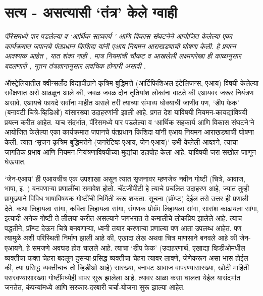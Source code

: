 \chapter{सत्य - असत्यासी `तंत्र' केले ग्वाही}

{\textit{पॅरिसमध्ये पार पडलेल्या व `आर्थिक सहकार्य '  आणि विकास संघटनेने आयोजित केलेल्या एका कार्यक्रमात जपानचे पंतप्रधान किशिदा यांनी एआय नियमन आराखड्याची घोषणा केली. हे प्रयत्न आवश्यक आहेत ,  यात शंका नाही .  मात्र नियमांची चौकट व आखलेली लक्ष्मणरेखा ही काळानुसार बदलणारी , नूतन तंत्रज्ञानानुसार लवचिक होणारी असावी . }}

\vspace{1.5em}

ऑस्ट्रेलियातील क्वीन्सलँड विद्यापीठाने कृत्रिम बुद्धिमत्ते (आर्टिफिशिअल इंटेलिजन्स, एआय) विषयी केलेल्या सर्वेक्षणात असे आढळून आले की, जवळ जवळ दोन तृतियांश लोकांना वाटते की एआयवर जरूर नियंत्रण असावे. एआयचे फायदे सर्वांना माहीत असले तरी त्याच्या संभाव्य धोक्याची जाणीव पण, `डीप फेक' (बनावटी चित्रे-व्हिडिओ) यांसारख्या उदाहरणांनी झाली आहे. प्रगत देश याविषयी नियमन-कायद्यांविषयी प्रयत्न करीत आहेत. याच संदर्भात, पॅरिसमध्ये पार पडलेल्या व `आर्थिक सहकार्य आणि विकास संघटने'ने आयोजित केलेल्या एका कार्यक्रमात जपानचे पंतप्रधान किशिदा यांनी एआय नियमन आराखड्याची घोषणा केली. त्यात `सृजन कृत्रिम बुद्धिमत्तेने (जनरेटिव्ह एआय, जेन-एआय)'  उभी केलेली आव्हाने, त्याचा जागतिक प्रभाव आणि नियमन-नियंत्रणाविषयीच्या मुद्यांचा उहापोह केला आहे. याविषयी जरा सखोल जाणून घेऊयात.

`जेन-एआय' ही एआयचीच एक उपशाखा असून त्यात सृजनावर म्हणजेच नवीन गोष्टी (चित्रे, आवाज, भाषा, इ. ) बनवणाऱ्या प्रणालींचा समावेश होतो. चॅटजीपीटी हे त्याचे प्रचलित उदाहरण आहे, ज्यात तुम्ही प्रामुख्याने विविध भाषाविषयक गोष्टींची निर्मिती करू शकता. सूचना (प्रॉम्प्ट) देईल तसे उत्तर ही प्रणाली देते. कथा लिहायला सांगा, कविता लिहायला सांगा, संगणक प्रोग्रॅम लिहायला सांगा, सारांश काढायला सांगा, इत्यादी अनेक गोष्टी ते लीलया करीत असल्याने जगभरात ते कमालीचे लोकप्रिय झालेले आहे. त्याच पद्धतीने, प्रॉम्प्ट देऊन चित्रे बनवणाऱ्या, ध्वनी तयार करणाऱ्या प्रणाल्या पण आता उपलब्ध आहेत. पण त्यामुळे अशी परिस्थिती निर्माण झाली आहे की, एखादा लेख अथवा चित्र माणसाने बनवले आहे की जेन-एआयने, हे समजणे अवघड होत चालले आहे. त्याचा `डीप फेक' (उदाहरणार्थ, एखाद्या व्हिडीओमधील व्यक्तीचा फक्त चेहरा बदलून दुसऱ्या-प्रसिद्ध व्यक्तीचा चेहरा त्यावर लावणे, जेणेकरून असा भास होईल की, त्या प्रसिद्ध व्यक्तीचाच तो व्हिडीओ  आहे) सारख्या, बनावट आवाज वापरण्यासारख्या, खोटी माहिती पसरवण्यासारख्या गोष्टींमध्येही वापर सुरू झालेला आहे. त्यावर आळा कसा घालता येईल यासंदर्भात जनतेत, कंपन्यांमध्ये आणि सरकार-दरबारी चर्चा-योजना सुरू झाल्या आहेत.

